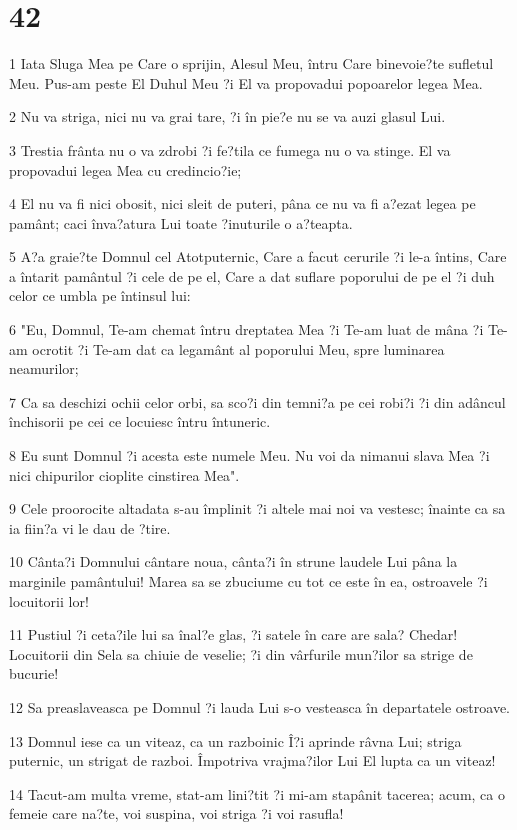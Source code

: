 \chapter{42}

\par 1 Iata Sluga Mea pe Care o sprijin, Alesul Meu, întru Care binevoie?te sufletul Meu. Pus-am peste El Duhul Meu ?i El va propovadui popoarelor legea Mea.
\par 2 Nu va striga, nici nu va grai tare, ?i în pie?e nu se va auzi glasul Lui.
\par 3 Trestia frânta nu o va zdrobi ?i fe?tila ce fumega nu o va stinge. El va propovadui legea Mea cu credincio?ie;
\par 4 El nu va fi nici obosit, nici sleit de puteri, pâna ce nu va fi a?ezat legea pe pamânt; caci înva?atura Lui toate ?inuturile o a?teapta.
\par 5 A?a graie?te Domnul cel Atotputernic, Care a facut cerurile ?i le-a întins, Care a întarit pamântul ?i cele de pe el, Care a dat suflare poporului de pe el ?i duh celor ce umbla pe întinsul lui:
\par 6 "Eu, Domnul, Te-am chemat întru dreptatea Mea ?i Te-am luat de mâna ?i Te-am ocrotit ?i Te-am dat ca legamânt al poporului Meu, spre luminarea neamurilor;
\par 7 Ca sa deschizi ochii celor orbi, sa sco?i din temni?a pe cei robi?i ?i din adâncul închisorii pe cei ce locuiesc întru întuneric.
\par 8 Eu sunt Domnul ?i acesta este numele Meu. Nu voi da nimanui slava Mea ?i nici chipurilor cioplite cinstirea Mea".
\par 9 Cele proorocite altadata s-au împlinit ?i altele mai noi va vestesc; înainte ca sa ia fiin?a vi le dau de ?tire.
\par 10 Cânta?i Domnului cântare noua, cânta?i în strune laudele Lui pâna la marginile pamântului! Marea sa se zbuciume cu tot ce este în ea, ostroavele ?i locuitorii lor!
\par 11 Pustiul ?i ceta?ile lui sa înal?e glas, ?i satele în care are sala? Chedar! Locuitorii din Sela sa chiuie de veselie; ?i din vârfurile mun?ilor sa strige de bucurie!
\par 12 Sa preaslaveasca pe Domnul ?i lauda Lui s-o vesteasca în departatele ostroave.
\par 13 Domnul iese ca un viteaz, ca un razboinic Î?i aprinde râvna Lui; striga puternic, un strigat de razboi. Împotriva vrajma?ilor Lui El lupta ca un viteaz!
\par 14 Tacut-am multa vreme, stat-am lini?tit ?i mi-am stapânit tacerea; acum, ca o femeie care na?te, voi suspina, voi striga ?i voi rasufla!
